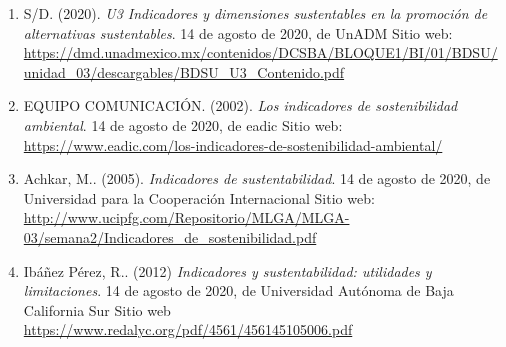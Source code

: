 \documentclass[12pt]{article}
\begin{document}
\begin{enumerate}[I]

	\item S/D. (2020). \emph{U3 \textbar{} Indicadores y dimensiones sustentables en la promoción de alternativas sustentables}. 14 de agosto de 2020, de UnADM Sitio web: \\\url{https://dmd.unadmexico.mx/contenidos/DCSBA/BLOQUE1/BI/01/BDSU/unidad_03/descargables/BDSU_U3_Contenido.pdf}
	\item EQUIPO COMUNICACIÓN. (2002). \emph{Los indicadores de sostenibilidad ambiental}. 14 de agosto de 2020, de eadic Sitio web: \\\url{https://www.eadic.com/los-indicadores-de-sostenibilidad-ambiental/}
	\item Achkar, M.. (2005). \emph{Indicadores de sustentabilidad}. 14 de agosto de 2020, de Universidad para la Cooperación Internacional Sitio web: \url{http://www.ucipfg.com/Repositorio/MLGA/MLGA-03/semana2/Indicadores_de_sostenibilidad.pdf}
	\item Ibáñez Pérez, R.. (2012) \emph{Indicadores y sustentabilidad: utilidades y limitaciones}. 14 de agosto de 2020, de Universidad Autónoma de Baja California Sur Sitio web \url{https://www.redalyc.org/pdf/4561/456145105006.pdf}

\end{enumerate}
\end{document}
